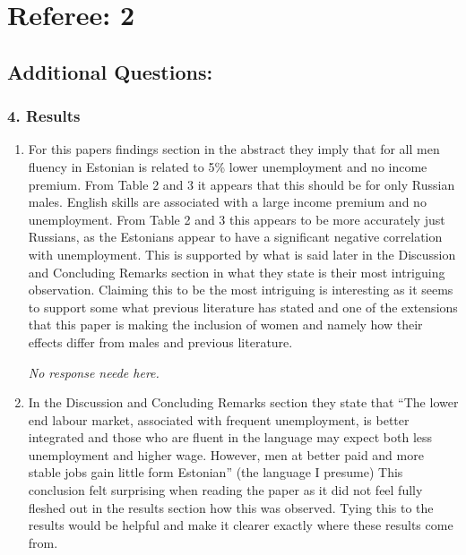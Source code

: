\documentclass{article}
\newenvironment{response}
{\slshape}{}
\begin{document}
\section{Referee: 2}


\subsection{Additional Questions:}

\subsubsection*{4. Results}

\begin{enumerate}
\item For this papers findings section in the abstract they imply that
  for all men fluency in Estonian is related to 5\% lower unemployment
  and no income premium.  From Table 2 and 3 it appears that this
  should be for only Russian males. English skills are associated with
  a large income premium and no unemployment. From Table 2 and 3 this
  appears to be more accurately just Russians, as the Estonians appear
  to have a significant negative correlation with unemployment.  This
  is supported by what is said later in the Discussion and Concluding
  Remarks section in what they state is their most intriguing
  observation.  Claiming this to be the most intriguing is interesting
  as it seems to support some what previous literature has stated and
  one of the extensions that this paper is making the inclusion of
  women and namely how their effects differ from males and previous
  literature. 

  \begin{response}
    No response neede here.
  \end{response}

\item In the Discussion and Concluding Remarks section they state that
  “The lower end labour market, associated with frequent unemployment,
  is better integrated and those who are fluent in the language may
  expect both less unemployment and higher wage. However, men at
  better paid and more stable jobs gain little form Estonian” (the
  language I presume) This conclusion felt surprising when reading the
  paper as it did not feel fully fleshed out in the results section
  how this was observed. Tying this to the results would be helpful
  and make it clearer exactly where these results come from.


\end{enumerate}
\end{document}
